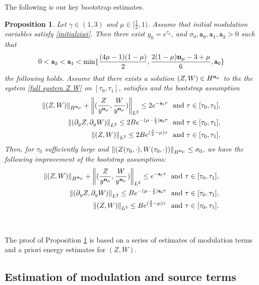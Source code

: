 \documentclass{article}
\newcommand{\norm}[1]{\left\lVert#1\right\rVert}
\newcommand{\ga}{\gamma}
\newcommand{\pa}{\partial}
\def\be{\begin{equation}}
\def\ee{\end{equation}}
\def\espz{Z}
\def\espw{W}
\def\epone{\mathtt{a_1}}
\def\eptwo{\mathtt{a_2}}
\def\epzero{\mathtt{a_0}}
\def\ndmu{{\bf{n}_{\mu}}}
\numberwithin{equation}{section}
\newtheorem{proposition}[theorem]{Proposition}
\begin{document}
The following is our key bootstrap estimates. 
\begin{proposition}\label{bootstrap lemma}
	Let $\ga\in(1,3)$ and $\mu\in[\frac12,1)$. Assume that initial modulation variables satisfy \eqref{initialziwi}. 
	Then there exist $y_0=e^{\tau_0}$, and $\sigma_0,\epzero,\epone, \eptwo >0$ 
    such that
	\be\label{sequence a_1, a_2, a_0}
		0< \eptwo<\epone<\min\{\frac{(4\mu-1)(1-\mu)}{2}, \frac{2(1-\mu)\ndmu-3+\mu}{6},\epzero\}
	\ee
	the following holds. 
    Assume that there exists a solution 
    $(\espz, \espw)\in H^\ndmu $ 
     to the
	the system \eqref{full system Z W} 
	on $[\tau_0,\tau_1]$, satisfies 
	and the bootstrap assumption
	\begin{align}
		\norm{(\espz, \espw)}_{\dot H^\ndmu}+\norm{(\frac{\espz}{y^\ndmu},\frac{\espw}{y^\ndmu})}_{L^2}\leq 2e^{-\epone \tau}\ \text{ and }\tau\in[\tau_0,\tau_1],\\
        \norm{(\pa_y\espz, \pa_y\espw)}_{L^2} \leq 2Be^{-(\mu-\frac12)\eptwo \tau}\ \text{ and }\tau\in[\tau_0,\tau_1],\\
		\norm{(\espz,\espw)}_{L^2} \leq 2Be^{(\frac32-\mu)\tau} \ \text{ and }\tau\in[\tau_0,\tau_1]. 
	\end{align}
	Then, for $\tau_0$ sufficiently large and $\norm{(\espz(\tau_0,\cdot), \espw(\tau_0,\cdot))}_{H^\ndmu}\leq \sigma_0$, we have the following improvement of the bootstrap assumptions:
	\begin{align}
		\norm{(\espz, \espw)}_{\dot H^\ndmu}+\norm{(\frac{\espz}{y^\ndmu},\frac{\espw}{y^\ndmu})}_{L^2} \leq e^{-\epone \tau}\ \text{ and }\tau\in[\tau_0,\tau_1],\label{payn z w}\\
        \norm{(\pa_y\espz, \pa_y\espw)}_{L^2} \leq Be^{-(\mu-\frac12)\eptwo \tau}\ \text{ and }\tau\in[\tau_0,\tau_1]\label{pay z w},\\
		\norm{(\espz,\espw)}_{L^2} \leq Be^{(\frac32-\mu)\tau} \ \text{ and }\tau\in[\tau_0,\tau_1]\label{L2}. 
	\end{align} 
\end{proposition}



\



The proof of Proposition \ref{bootstrap lemma} is  based on a series of estimates of modulation terms and a priori energy estimates for $(Z,W)$. 


\subsection{Estimation of modulation and source terms}
\end{document}
